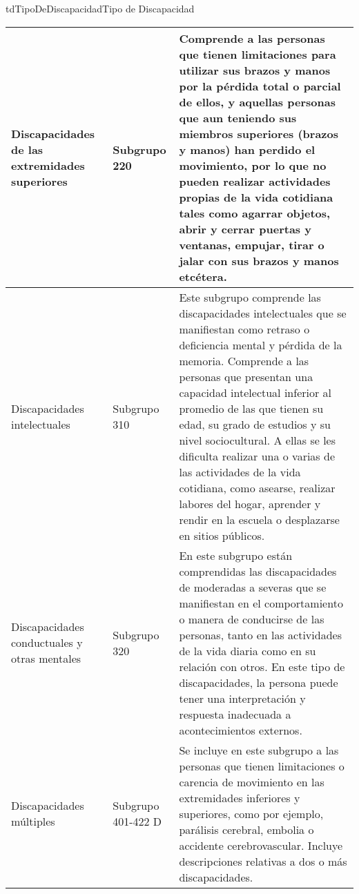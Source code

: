 \begin{TipoDeDato}{tdTipoDeDiscapacidad}{Tipo de Discapacidad}
\begin{longtable}{| p{}| p{}|p{}|}
				\hline
				Discapacidades de las extremidades superiores & Subgrupo 220 & Comprende a las personas que tienen limitaciones para utilizar sus brazos y manos por la pérdida total o parcial de ellos, y aquellas personas que aun teniendo sus miembros superiores (brazos y manos) han perdido el movimiento, por lo que no pueden realizar actividades propias de la vida cotidiana tales como agarrar objetos, abrir y cerrar puertas y ventanas, empujar, tirar o jalar con sus brazos y manos etcétera.\\
				\hline
				Discapacidades intelectuales & Subgrupo 310 & Este subgrupo comprende las discapacidades intelectuales que se manifiestan como retraso o deficiencia mental y pérdida de la memoria. Comprende a las personas que presentan una capacidad intelectual inferior al promedio de las que tienen su edad, su grado de estudios y su nivel sociocultural. A ellas se les dificulta realizar una o varias de las actividades de la vida cotidiana, como asearse, realizar labores del hogar, aprender y rendir en la escuela o desplazarse en sitios públicos.\\
				\hline
				Discapacidades conductuales y otras mentales & Subgrupo 320 & En este subgrupo están comprendidas las discapacidades de moderadas a severas que se manifiestan en el comportamiento o manera de conducirse de las personas, tanto en las actividades de la vida diaria como en su relación con otros. En este tipo de discapacidades, la persona puede tener una interpretación y respuesta inadecuada a acontecimientos externos.\\
				\hline
				Discapacidades múltiples & Subgrupo 401-422 D& Se incluye en este subgrupo a las personas que tienen limitaciones o carencia de movimiento en las extremidades inferiores y superiores, como por ejemplo, parálisis cerebral, embolia o accidente cerebrovascular. Incluye descripciones relativas a dos o más discapacidades.\\
				\hline
	 		\end{longtable}
\end{TipoDeDato}


